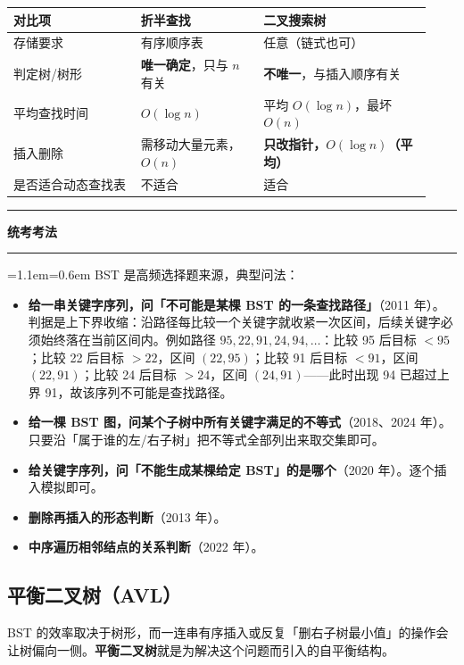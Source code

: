 \documentclass[11pt,openany,UTF8]{ctexbook}
\newcommand{\callouthead}[2]{%
  \par\addvspace{7pt}\noindent
  {\color{#1}\rule[-0.15em]{3pt}{1.05em}}\hspace{0.5em}%
  {\bfseries\color{#1}#2}\par\nobreak\vspace{-0.35em}%
  {\color{rulesep}\hrule height 0.4pt}\nobreak\vspace{0.45em}%
  \begingroup\small\setlength{\parindent}{0pt}%
  \leftskip=1.1em\rightskip=0.6em\noindent\ignorespaces}
\newcommand{\calloutend}{\par\endgroup\addvspace{7pt}}
\newenvironment{callexam}[1]{\callouthead{exambar}{#1}}{\calloutend}
\begin{document}
\begingroup\small\setlength{\tabcolsep}{4.0pt}
\begin{longtable}{@{}L{0.2830\linewidth}L{0.2741\linewidth}L{0.3714\linewidth}@{}}
\toprule
\textbf{对比项} & \textbf{折半查找} & \textbf{二叉搜索树} \\
\midrule
\endhead
存储要求 & 有序顺序表 & 任意（链式也可） \\
判定树/树形 & \textbf{唯一确定}，只与 $n$ 有关 & \textbf{不唯一}，与插入顺序有关 \\
平均查找时间 & $O(\log n)$ & 平均 $O(\log n)$，最坏 $O(n)$ \\
插入删除 & 需移动大量元素，$O(n)$ & \textbf{只改指针，$O(\log n)$（平均）} \\
是否适合动态查找表 & 不适合 & 适合 \\
\bottomrule
\end{longtable}
\endgroup

\begin{callexam}{统考考法}
BST 是高频选择题来源，典型问法：

\begin{itemize}
\item \textbf{给一串关键字序列，问「不可能是某棵 BST 的一条查找路径」}（2011 年）。判据是上下界收缩：沿路径每比较一个关键字就收紧一次区间，后续关键字必须始终落在当前区间内。例如路径 $95,22,91,24,94,\dots$：比较 95 后目标 $<95$；比较 22 后目标 $>22$，区间 $(22,95)$；比较 91 后目标 $<91$，区间 $(22,91)$；比较 24 后目标 $>24$，区间 $(24,91)$——此时出现 94 已超过上界 91，故该序列不可能是查找路径。
\item \textbf{给一棵 BST 图，问某个子树中所有关键字满足的不等式}（2018、2024 年）。只要沿「属于谁的左/右子树」把不等式全部列出来取交集即可。
\item \textbf{给关键字序列，问「不能生成某棵给定 BST」的是哪个}（2020 年）。逐个插入模拟即可。
\item \textbf{删除再插入的形态判断}（2013 年）。
\item \textbf{中序遍历相邻结点的关系判断}（2022 年）。
\end{itemize}
\end{callexam}

\subsection{平衡二叉树（AVL）}

BST 的效率取决于树形，而一连串有序插入或反复「删右子树最小值」的操作会让树偏向一侧。\textbf{平衡二叉树}就是为解决这个问题而引入的自平衡结构。
\end{document}
